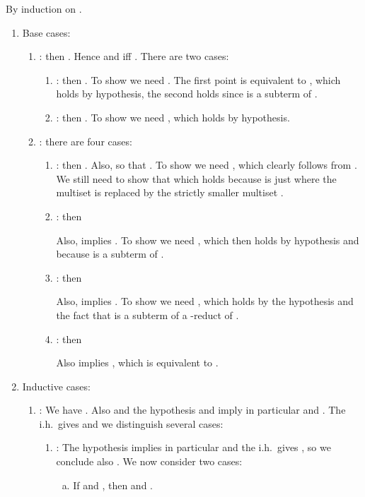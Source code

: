 \documentclass{LMCS}
\renewcommand{\>}{\rightarrow}
\newcommand{\ih}{i.h.}
\begin{document}
\proof
By induction on .
\begin{enumerate}[]
\item Base cases:
\begin{enumerate}[]
\item : then 
  . Hence
   and
   iff . There are two cases:
\begin{enumerate}[(1)]
  \item \underline{}: then 
    . To show 
     we need  . The first point is equivalent to
    , which holds by hypothesis, the second 
    holds since   is a
    subterm of .
\item \underline{}: then 
  . To show 
   we need  , which holds by hypothesis. 
 \end{enumerate}
\item : there are four cases:
\begin{enumerate}[(1)]

\item \emph{}:
    then 
    . Also, 
    so that  
    . To show 
     we need 
    , which clearly
    follows from . We still 
    need to  show that
     which holds because
     is just  where 
    the multiset  is replaced by the strictly smaller multiset
    . 

\item \emph{}: 
   then 
   
  Also, 
   implies . 
  To show 
   we need ,
  which then holds by hypothesis and because  is a subterm of
  .


 \item \emph{}: then
   

   Also,  
    implies  . To show
    we need 
   , which holds
   by the hypothesis and the fact that  is a subterm of a -reduct of 
   . 


\item \emph{}: then
  

  Also 
   implies  , which is equivalent to 
  . 

\end{enumerate}
\end{enumerate}
\item Inductive cases:
\begin{enumerate}[]

\item : 
  We have .
  Also 
   and the hypothesis
    and  imply  in particular
   and .
  The \ih\ gives  and we distinguish 
  several  cases: 
  \begin{enumerate}[(1)]
  \item \emph{}: 
        The hypothesis   implies in particular
         and the \ih\ 
         gives
        , so 
        we conclude also . We now consider two cases:
        \begin{enumerate}[(a)]
        \item If 
              and , 
        then  and 
        .
        

\end{enumerate}
\end{enumerate}
\end{enumerate}
\end{enumerate}
\end{document}
